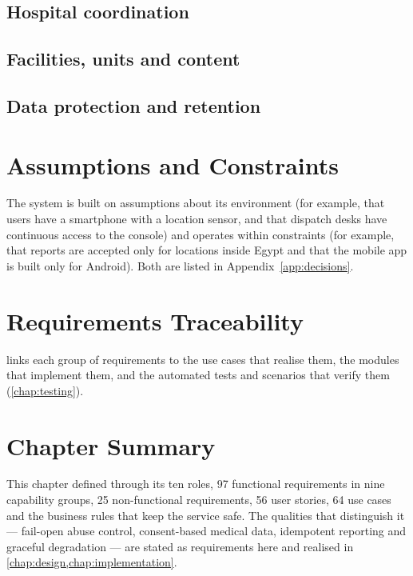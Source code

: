 \subsection{Hospital coordination}
\subsection{Facilities, units and content}
\subsection{Data protection and retention}

\section{Assumptions and Constraints}

The system is built on assumptions about its environment (for example, that users have a smartphone with a
location sensor, and that dispatch desks have continuous access to the console) and operates within constraints
(for example, that reports are accepted only for locations inside Egypt and that the mobile app is built only for
Android). Both are listed in Appendix~\ref{app:decisions}.

\section{Requirements Traceability}\label{sec:traceability}

 links each group of requirements to the use cases that realise them, the modules that implement
them, and the automated tests and scenarios that verify them (\cref{chap:testing}).



\section{Chapter Summary}

This chapter defined \ProjectName{} through its ten roles, 97 functional requirements in nine capability groups,
25 non-functional requirements, 56 user stories, 64 use cases and the business rules that keep the service safe.
The qualities that distinguish it --- fail-open abuse control, consent-based medical data, idempotent reporting and
graceful degradation --- are stated as requirements here and realised in \cref{chap:design,chap:implementation}.
